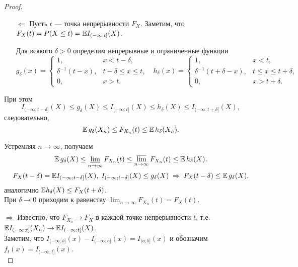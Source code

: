 \begin{proof}
    \begin{itemize}
        \item[$\Leftarrow$] Пусть $t$ --- точка непрерывности $F_X$. Заметим, что 
        $F_X(t) = P(X \le t) = \mathbb{E} I_{(-\infty; t]}(X)$.
        
        Для всякого $\delta > 0$ определим непрерывные и ограниченные функции
        \[ g_{\delta}(x) = 
        \left\{\begin{array}{ll} 
        1, & x < t - \delta, \\ 
        \delta^{-1}(t - x), & t - \delta \le x \le t, \\ 
        0, & x > t. 
        \end{array}\right. \ \ \  h_{\delta}(x) = 
        \left\{\begin{array}{ll} 
        1, & x < t, \\ 
        \delta^{-1}(t + \delta - x), & t \le x \le t + \delta, \\ 
        0, & x > t + \delta. 
        \end{array}\right. \]
    \end{itemize}
    При этом 
    \[ I_{(-\infty; t - \delta]}(X) \le g_{\delta}(X) \le  I_{(-\infty; t]}(X) \le h_{\delta}(X) \le I_{(-\infty; t + \delta]}(X), \]
    следовательно, 
    \[ \mathbb{E}\,g_{\delta}(X_n) \le F_{X_n}(t) \le \mathbb{E}\,h_{\delta}(X_n). \]
    
    Устремляя $n \to \infty$, получаем
    \[ \mathbb{E}\,g_{\delta}(X) \le \varliminf_{n \to \infty} F_{X_n}(t) \le \varlimsup_{n \to \infty} F_{X_n}(t) \le \mathbb{E}\,h_{\delta}(X). \]
    \[ F_X(t - \delta) = \mathbb{E} I_{(-\infty; t - \delta]}(X), \; I_{(-\infty; t - \delta]}(X) \le g_{\delta}(X) \;\Rightarrow\; F_X(t - \delta) \le \mathbb{E}\,g_{\delta}(X), \]
    аналогично $\mathbb{E} h_{\delta}(X) \le F_X(t + \delta)$. \\
    
    При $\delta \to 0$ приходим к равенству $\lim_{n \to \infty} F_{X_n}(t) = F_X(t)$. \\
    
    \item[$\Rightarrow$] Известно, что $F_{X_n} \to F_X$ в каждой точке непрерывности $t$, т.е. 
    $\mathbb{E} I_{(-\infty; t]}(X_n) \to \mathbb{E} I_{(-\infty; t]}(X)$. \\
    
    Заметим, что $I_{(-\infty; b]}(x) - I_{(-\infty; a]}(x) = I_{(a; b]}(x)$ и обозначим $f_t(x) = I_{(-\infty; t]}(x)$. \\
    

\end{proof}
